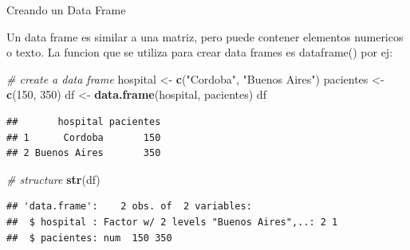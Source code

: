 \documentclass[ignorenonframetext,]{beamer}
\newenvironment{Shaded}{\begin{snugshade}}{\end{snugshade}}
\newcommand{\KeywordTok}[1]{\textcolor[rgb]{0.13,0.29,0.53}{\textbf{#1}}}
\newcommand{\DecValTok}[1]{\textcolor[rgb]{0.00,0.00,0.81}{#1}}
\newcommand{\StringTok}[1]{\textcolor[rgb]{0.31,0.60,0.02}{#1}}
\newcommand{\CommentTok}[1]{\textcolor[rgb]{0.56,0.35,0.01}{\textit{#1}}}
\newcommand{\NormalTok}[1]{#1}
\begin{document}
\begin{frame}[fragile]{Creando un Data Frame}

Un data frame es similar a una matriz, pero puede contener elementos
numericos o texto. La funcion que se utiliza para crear data frames es
dataframe() por ej:

\begin{Shaded}
\begin{Highlighting}[]
\CommentTok{# create a data frame}
\NormalTok{hospital <-}\StringTok{ }\KeywordTok{c}\NormalTok{(}\StringTok{"Cordoba"}\NormalTok{, }\StringTok{"Buenos Aires"}\NormalTok{)}
\NormalTok{pacientes <-}\StringTok{ }\KeywordTok{c}\NormalTok{(}\DecValTok{150}\NormalTok{, }\DecValTok{350}\NormalTok{)}
\NormalTok{df <-}\StringTok{ }\KeywordTok{data.frame}\NormalTok{(hospital, pacientes)}
\NormalTok{df}
\end{Highlighting}
\end{Shaded}

\begin{verbatim}
##       hospital pacientes
## 1      Cordoba       150
## 2 Buenos Aires       350
\end{verbatim}

\begin{Shaded}
\begin{Highlighting}[]
\CommentTok{# structure}
\KeywordTok{str}\NormalTok{(df)}
\end{Highlighting}
\end{Shaded}

\begin{verbatim}
## 'data.frame':    2 obs. of  2 variables:
##  $ hospital : Factor w/ 2 levels "Buenos Aires",..: 2 1
##  $ pacientes: num  150 350
\end{verbatim}

\end{frame}
\end{document}
